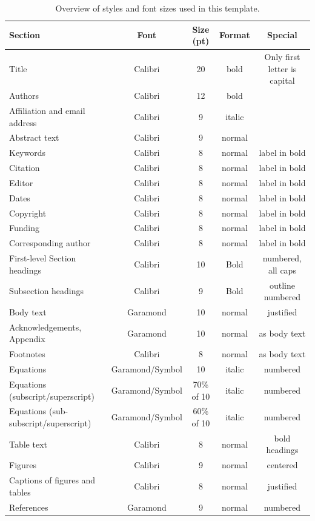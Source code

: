 \documentclass[10pt]{../imeko_acta}
\begin{document}
\begin{table}[!h]
	\caption{Overview of styles and font sizes used in this template.}
	\label{tab:tab1}
	\centering
	\renewcommand{\arraystretch}{1.15}\footnotesize
	\begin{tabularx}{\textwidth}{lCCCC}
		\toprule
		Section & Font & Size (pt) & Format & Special \\
		\midrule
		Title & Calibri & 20 & bold & Only first letter is capital \\
		Authors & Calibri & 12 & bold &  \\
		Affiliation and email address & Calibri & 9 & italic &  \\
		Abstract text & Calibri & 9 & normal &  \\
		Keywords & Calibri & 8 & normal & label in bold \\
		Citation & Calibri & 8 & normal & label in bold \\
		Editor & Calibri & 8 & normal & label in bold \\
		Dates & Calibri & 8 & normal & label in bold \\
		Copyright & Calibri & 8 & normal & label in bold \\
		Funding & Calibri & 8 & normal & label in bold \\
		Corresponding author & Calibri & 8 & normal & label in bold \\
		First-level Section headings  & Calibri & 10 & Bold & numbered, all caps \\
		Subsection headings & Calibri & 9 & Bold & outline numbered \\
		Body text & Garamond & 10 & normal & justified \\
		Acknowledgements, Appendix & Garamond & 10 & normal & as body text \\
		Footnotes  & Calibri & 8 & normal & as body text \\
		Equations & Garamond/Symbol & 10 & italic & numbered \\
		Equations (subscript/superscript) & Garamond/Symbol & 70\% of 10 & italic & numbered \\
		Equations (sub-subscript/superscript) & Garamond/Symbol & 60\% of 10 & italic & numbered \\
		Table text & Calibri & 8 & normal & bold headings \\
		Figures & Calibri & 9 & normal & centered \\
		Captions of figures and tables & Calibri & 8 & normal & justified \\
		References & Garamond & 9 & normal & numbered \\
		\bottomrule
	\end{tabularx}
\end{table}
\end{document}
